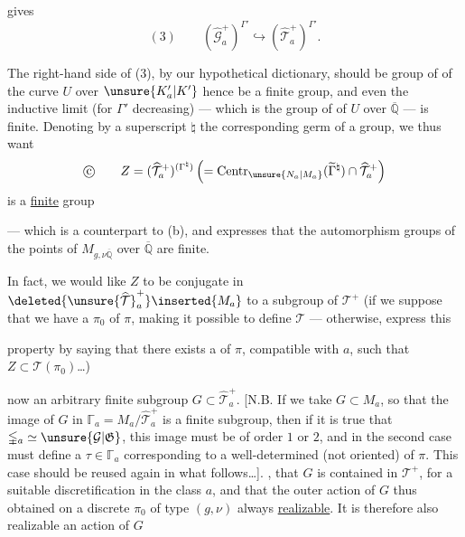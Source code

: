 
gives
\[
(3)\qquad (\widehat{\mathcal G}_a^+)^{\Gamma'}
\hookrightarrow (\widehat{\mathcal T}_a^+)^{\Gamma'}.
\]

The right-hand side of (3), by our hypothetical dictionary, should be   group of  of the curve $U$ over $\unsure{K'_a|K'}$ hence be a finite group, and even  the inductive limit (for $\Gamma'$ decreasing) --- which is the group of  of $U$ over $\overline{\mathbb Q}$ --- is finite. Denoting by a superscript $\natural$ the corresponding germ of a group, we thus want
\[
\text{\textcircled{c}}\qquad
Z=(\widehat{\mathcal T}_a^+)^{(\Gamma^{\natural})}
\left(=\operatorname{Centr}_{\unsure{N_a|M_a}}
(\widetilde{\Gamma}^{\natural})\cap\widehat{\mathcal T}_a^+\right)
\]
is a \uline{finite} group

--- which is a counterpart to (b), and expresses that the automorphism groups of the points of $M_{g,\nu\overline{\mathbb Q}}$ over $\overline{\mathbb Q}$ are finite.

In fact, we would like $Z$ to be conjugate in $\deleted{\unsure{\widehat{\mathcal T}}_a^+}\inserted{M_a}$ to a subgroup of  $\mathcal T^+$  (if we suppose that we have a   $\pi_0$ of $\pi$, making it possible to define $\mathcal T$ --- otherwise,  express this


property by saying that there exists a   of $\pi$, compatible with $a$, such that $Z\subset\mathcal T(\pi_0)$\ldots)

 now an arbitrary finite subgroup $G\subset\widehat{\mathcal T}_a^+$. [N.B. If we take  $G\subset M_a$, so that the image of $G$ in $\mathbb{\Gamma}_a=M_a/\widehat{\mathcal T}_a^+$ is a finite subgroup, then if it  is true that $\mathbb{\Gamma}_a\simeq\unsure{\mathcal G|\mathfrak G}$,  this image must be of order $1$ or $2$, and in the second case must  define a $\tau\in\mathbb{\Gamma}_a$ corresponding to a well-determined \uline{} (not oriented) of $\pi$. This case should be reused again in what follows\ldots].   , that $G$ is contained in $\mathcal T^+$,  for a suitable discretification in the class $a$, and that the outer action of $G$ thus obtained on a discrete $\pi_0$ of type $(g,\nu)$  always \uline{realizable}. It is therefore also realizable  an action of $G$

